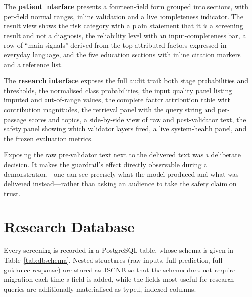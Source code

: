 The \textbf{patient interface} presents a fourteen-field form grouped into
sections, with per-field normal ranges, inline validation and a live
completeness indicator. The result view shows the risk category with a plain
statement that it is a screening result and not a diagnosis, the reliability
level with an input-completeness bar, a row of ``main signals'' derived from the
top attributed factors expressed in everyday language, and the five education
sections with inline citation markers and a reference list.

The \textbf{research interface} exposes the full audit trail: both stage
probabilities and thresholds, the normalised class probabilities, the input
quality panel listing imputed and out-of-range values, the complete factor
attribution table with contribution magnitudes, the retrieval panel with the
query string and per-passage scores and topics, a side-by-side view of raw and
post-validator text, the safety panel showing which validator layers fired, a
live system-health panel, and the frozen evaluation metrics.

Exposing the raw pre-validator text next to the delivered text was a deliberate
decision. It makes the guardrail's effect directly observable during a
demonstration---one can see precisely what the model produced and what was
delivered instead---rather than asking an audience to take the safety claim on
trust.

\section{Research Database}
\label{sec:database}

Every screening is recorded in a PostgreSQL table, whose schema is given in
Table~\ref{tab:dbschema}. Nested structures (raw inputs, full prediction, full
guidance response) are stored as JSONB so that the schema does not require
migration each time a field is added, while the fields most useful for research
queries are additionally materialised as typed, indexed columns.

